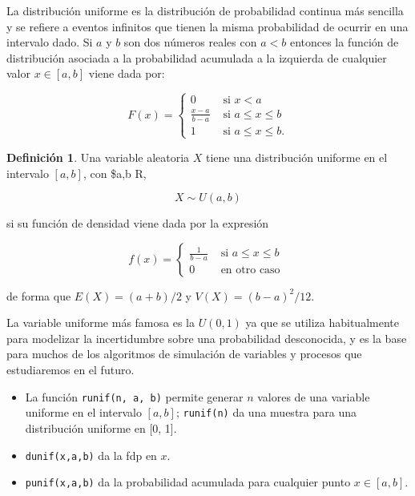 \documentclass[
]{book}
\providecommand{\tightlist}{%
  \setlength{\itemsep}{0pt}\setlength{\parskip}{0pt}}
\newenvironment{yellowbox}{
  \definecolor{shadecolor}{rgb}{210, 180, 140}  
  \color{black}
  \begin{shaded}}
 {\end{shaded}}
\newenvironment{whitebox}{
  \definecolor{shadecolor}{rgb}{255, 255, 255}  
  \color{black}
  \begin{shaded}}
 {\end{shaded}}
\theoremstyle{definition}
\newtheorem{definition}{Definición}[chapter]
\theoremstyle{definition}
\theoremstyle{definition}
\theoremstyle{definition}
\theoremstyle{remark}
\begin{document}
La distribución uniforme es la distribución de probabilidad continua más sencilla y se refiere a eventos infinitos que tienen la misma probabilidad de ocurrir en una intervalo dado. Si \(a\) y \(b\) son dos números reales con \(a < b\) entonces la función de distribución asociada a la probabilidad acumulada a la izquierda de cualquier valor \(x \in [a, b]\) viene dada por:

\begin{equation}
F(x) = 
\begin{cases}
0 & \text{ si } x < a \\
\frac{x-a}{b-a} & \text{ si } a \leq x \leq b\\
1 & \text{ si } a \leq x \leq b.
\end{cases}
\label{eq:var-uniforme2}
\end{equation}

\begin{yellowbox}

\begin{definition}
\protect\hypertarget{def:vuniforme}{}{\label{def:vuniforme} }Una variable aleatoria \(X\) tiene una distribución uniforme en el intervalo \([a, b]\), con \$a,b \in R,

\[X \sim U(a,b)\]

si su función de densidad viene dada por la expresión

\begin{equation}
f(x) = 
\begin{cases}
\frac{1}{b-a} & \text{ si } a \leq x \leq b\\
0 & \text{ en otro caso }
\end{cases}
\label{eq:var-uniforme}
\end{equation}

de forma que \(E(X) = (a+b)/2\) y \(V(X) = (b-a)^2/12.\)\\
\end{definition}

\end{yellowbox}

La variable uniforme más famosa es la \(U(0,1)\) ya que se utiliza habitualmente para modelizar la incertidumbre sobre una probabilidad desconocida, y es la base para muchos de los algoritmos de simulación de variables y procesos que estudiaremos en el futuro.

\begin{whitebox}

\begin{itemize}
\tightlist
\item
  La función \texttt{runif(n,\ a,\ b)} permite generar \(n\) valores de una variable uniforme en el intervalo \([a, b]\); \texttt{runif(n)} da una muestra para una distribución uniforme en {[}0, 1{]}.
\item
  \texttt{dunif(x,a,b)} da la fdp en \(x\).
\item
  \texttt{punif(x,a,b)} da la probabilidad acumulada para cualquier punto \(x \in [a,b]\).
\end{itemize}

\end{whitebox}
\end{document}
